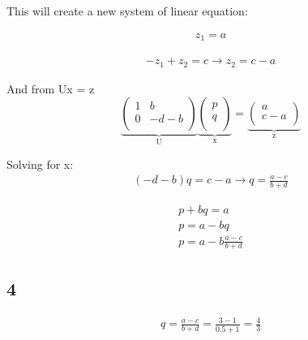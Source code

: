 \documentclass[12pt]{report}
\begin{document}
This will create a new system of linear equation:

\begin{equation}
\begin{aligned}
z_1 = a
\end{aligned}
\end{equation}

\begin{equation}
\begin{aligned}
-z_1 + z_2 = c \rightarrow z_2 = c - a
\end{aligned}
\end{equation}

And from Ux = z
$$
\underbrace{\begin{pmatrix}
1&b\\
0&-d - b\\
\end{pmatrix}}_\text{U}
\underbrace{\begin{pmatrix}
p\\
q\\
\end{pmatrix}}_\text{x}
=
\underbrace{\begin{pmatrix}
a\\
c - a\\
\end{pmatrix}}_\text{z}
$$

Solving for x: 
\begin{equation}
\begin{aligned}
(-d - b)q = c - a \rightarrow q = \frac{a - c}{b + d} 
\end{aligned}
\end{equation}

\begin{equation}
\begin{aligned}
p + bq = a\\
p = a - bq\\
p = a - b \frac{a - c}{b + d}
\end{aligned}
\end{equation}

\subsection*{4}
\begin{equation}
\begin{aligned}
q = \frac{a - c}{b + d} = \frac{3 - 1}{0.5 + 1}= \frac{4}{3}
\end{aligned}
\end{equation}
\end{document}
